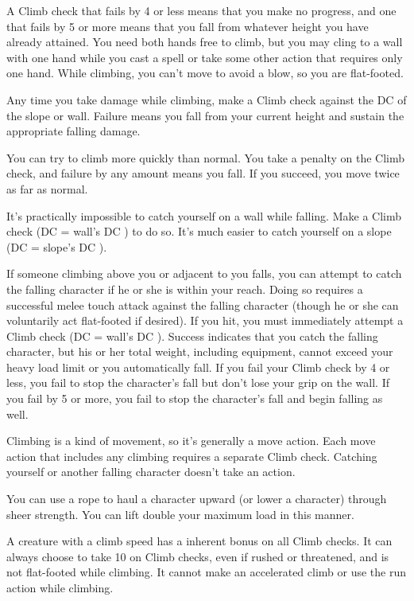 A Climb check that fails by 4 or less means that you make no progress, and one that fails by 5 or more means that you fall from whatever height you have already attained. You need both hands free to climb, but you may cling to a wall with one hand while you cast a spell or take some other action that requires only one hand. While climbing, you can't move to avoid a blow, so you are flat-footed.

Any time you take damage while climbing, make a Climb check against the DC of the slope or wall. Failure means you fall from your current height and sustain the appropriate falling damage.

 You can try to climb more quickly than normal. You take a  penalty on the Climb check, and failure by any amount means you fall. If you succeed, you move twice as far as normal.

 It's practically impossible to catch yourself on a wall while falling. Make a Climb check (DC = wall's DC ) to do so. It's much easier to catch yourself on a slope (DC = slope's DC ).

 If someone climbing above you or adjacent to you falls, you can attempt to catch the falling character if he or she is within your reach. Doing so requires a successful melee touch attack against the falling character (though he or she can voluntarily act flat-footed if desired). If you hit, you must immediately attempt a Climb check (DC = wall's DC ). Success indicates that you catch the falling character, but his or her total weight, including equipment, cannot exceed your heavy load limit or you automatically fall. If you fail your Climb check by 4 or less, you fail to stop the character's fall but don't lose your grip on the wall. If you fail by 5 or more, you fail to stop the character's fall and begin falling as well.

 Climbing is a kind of movement, so it's generally a move action. Each move action that includes any climbing requires a separate Climb check. Catching yourself or another falling character doesn't take an action.

 You can use a rope to haul a character upward (or lower a character) through sheer strength. You can lift double your maximum load in this manner.

\par A creature with a climb speed has a  inherent bonus on all Climb checks. It can always choose to take 10 on Climb checks, even if rushed or threatened, and is not flat-footed while climbing. It cannot make an accelerated climb or use the run action while climbing.

